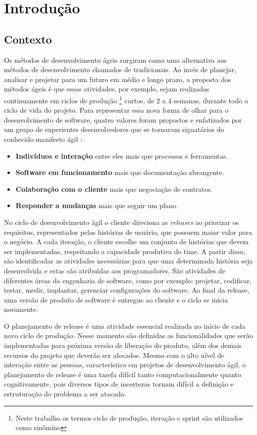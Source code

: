 \chapter{Introdução}
\label{int}
\section{Contexto}
\label{int:con}
Os métodos de desenvolvimento ágeis surgiram como uma alternativa aos métodos de desenvolvimento chamados de tradicionais. Ao invés de planejar, analisar e projetar para um futuro em médio e longo prazo, a proposta dos métodos ágeis é que essas atividades, por exemplo, sejam realizadas continuamente em ciclos de produção \footnote{Neste trabalho os termos ciclo de produção, iteração e sprint são utilizados como sinômino} curtos, de 2 a 4 semanas, durante todo o ciclo de vida do projeto.
Para representar essa nova forma de olhar para o desenvolvimento de software, quatro valores foram propostos e enfatizados por um grupo de experientes desenvolvedores que se tornaram signatários do conhecido manifesto ágil \cite{beckManifesto}:
\begin{itemize}
    \item \textbf{Indivíduos e interação} entre eles mais que processos e ferramentas.
    \item \textbf{Software em funcionamento} mais que documentação abrangente.
    \item \textbf{Colaboração com o cliente} mais que negociação de contratos.
    \item \textbf{Responder a mudanças} mais que seguir um plano.
\end{itemize}

No ciclo de desenvolvimento ágil o cliente direciona as \textit{releases} ao priorizar os requisitos, representados pelas histórias de usuário, que possuem maior valor para o negócio. A cada iteração, o cliente escolhe um conjunto de  histórias que devem ser implementadas, respeitando a capacidade produtiva do time. A partir disso, são identificadas as atividades necessárias para que uma determinada história seja desenvolvida e estas são atribuídas aos programadores. São atividades de diferentes áreas da engenharia de software, como por exemplo: projetar, codificar, testar, medir, implantar, gerenciar configurações do software. Ao final da release, uma versão de produto de software é entregue ao cliente e o ciclo se inicia novamente.

O planejamento de release é uma atividade essencial realizada no início de cada novo ciclo de produção. Nesse momento são definidas as funcionalidades que serão implementadas para próxima versão de liberação do produto, além dos demais recursos do projeto que deverão ser alocados. Mesmo com o alto nível de interação entre as pessoas, característico em projetos de desenvolvimento ágil, o planejamento de release é uma tarefa difícil tanto computacionalmente quanto cognitivamente, pois diversos tipos de incertezas tornam difícil a definição e estruturação do problema a ser atacado\cite{Ngo}.

